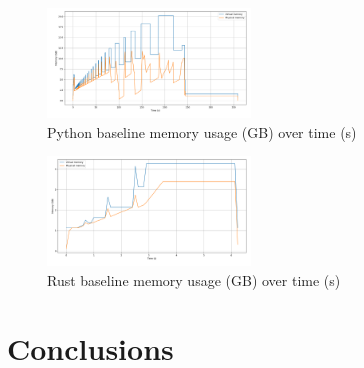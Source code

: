 \documentclass{article}
\begin{document}
\begin{multicols}{2}
\begin{figure}[H]
    \centering
    \includegraphics[width=0.48\textwidth]{figures/baseline_py.png}
    \caption{Python baseline memory usage (GB) over time (s)}
    \label{fig:baseline_py}
\end{figure}
\begin{figure}[H]
    \centering
    \includegraphics[width=0.48\textwidth]{figures/baseline_rs.png}
    \caption{Rust baseline memory usage (GB) over time (s)}
    \label{fig:baseline_rs}
\end{figure}

\section{Conclusions}
\end{multicols}
\end{document}
